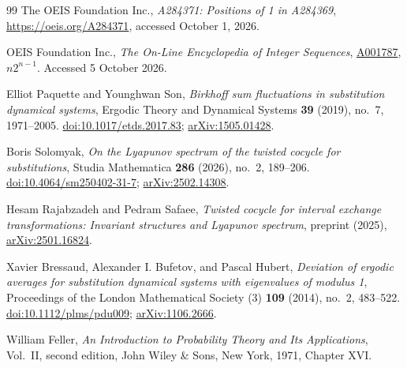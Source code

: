 \documentclass[11pt]{article}
\numberwithin{equation}{section}
\theoremstyle{definition}
\theoremstyle{remark}
\begin{document}
\begin{thebibliography}{99}
The OEIS Foundation Inc.,
\emph{A284371: Positions of 1 in A284369},
\url{https://oeis.org/A284371}, accessed October 1, 2026.

OEIS Foundation Inc., \emph{The On-Line Encyclopedia of Integer Sequences},
\href{https://oeis.org/A001787}{A001787}, $n2^{n-1}$.
Accessed 5 October 2026.

Elliot Paquette and Younghwan Son,
\emph{Birkhoff sum fluctuations in substitution dynamical systems},
Ergodic Theory and Dynamical Systems \textbf{39} (2019),
no.~7, 1971--2005.
\href{https://doi.org/10.1017/etds.2017.83}{doi:10.1017/etds.2017.83};
\href{https://arxiv.org/abs/1505.01428}{arXiv:1505.01428}.

Boris Solomyak,
\emph{On the Lyapunov spectrum of the twisted cocycle for substitutions},
Studia Mathematica \textbf{286} (2026), no.~2, 189--206.
\href{https://doi.org/10.4064/sm250402-31-7}{doi:10.4064/sm250402-31-7};
\href{https://arxiv.org/abs/2502.14308}{arXiv:2502.14308}.

Hesam Rajabzadeh and Pedram Safaee,
\emph{Twisted cocycle for interval exchange transformations:
Invariant structures and Lyapunov spectrum},
preprint (2025),
\href{https://arxiv.org/abs/2501.16824}{arXiv:2501.16824}.

Xavier Bressaud, Alexander I. Bufetov, and Pascal Hubert,
\emph{Deviation of ergodic averages for substitution dynamical systems
with eigenvalues of modulus 1},
Proceedings of the London Mathematical Society (3)
\textbf{109} (2014), no.~2, 483--522.
\href{https://doi.org/10.1112/plms/pdu009}{doi:10.1112/plms/pdu009};
\href{https://arxiv.org/abs/1106.2666}{arXiv:1106.2666}.

William Feller,
\emph{An Introduction to Probability Theory and Its Applications},
Vol.~II, second edition, John Wiley \& Sons, New York, 1971,
Chapter XVI.
\end{thebibliography}
\end{document}
